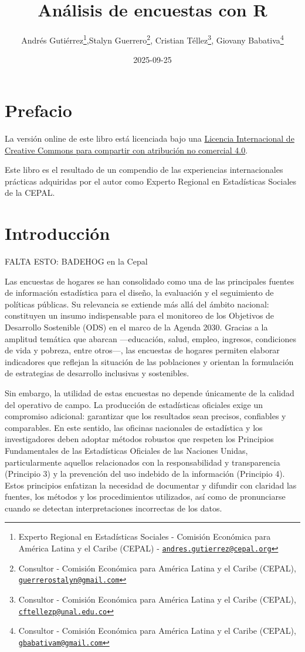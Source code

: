 \documentclass[
  spanish,
  12pt,
]{book}
\title{Análisis de encuestas con R}
\author{Andrés Gutiérrez\footnote{Experto Regional en Estadísticas Sociales - Comisión Económica para América Latina y el Caribe (CEPAL) - \href{mailto:andres.gutierrez@cepal.org}{\nolinkurl{andres.gutierrez@cepal.org}}},Stalyn Guerrero\footnote{Consultor - Comisión Económica para América Latina y el Caribe (CEPAL), \href{mailto:guerrerostalyn@gmail.com}{\nolinkurl{guerrerostalyn@gmail.com}}}, Cristian Téllez\footnote{Consultor - Comisión Económica para América Latina y el Caribe (CEPAL), \href{mailto:cftellezp@unal.edu.co}{\nolinkurl{cftellezp@unal.edu.co}}}, Giovany Babativa\footnote{Consultor - Comisión Económica para América Latina y el Caribe (CEPAL), \href{mailto:gbabativam@gmail.com}{\nolinkurl{gbabativam@gmail.com}}}}
\date{2025-09-25}
\begin{document}
\maketitle

{
\hypersetup{linkcolor=}
\setcounter{tocdepth}{1}
\tableofcontents
}
\listoffigures
\listoftables
\chapter*{Prefacio}\label{prefacio}

La versión online de este libro está licenciada bajo una \href{http://creativecommons.org/licenses/by-nc-sa/4.0/}{Licencia Internacional de Creative Commons para compartir con atribución no comercial 4.0}.

Este libro es el resultado de un compendio de las experiencias internacionales prácticas adquiridas por el autor como Experto Regional en Estadísticas Sociales de la CEPAL.

\chapter{Introducción}\label{introducciuxf3n}

FALTA ESTO: BADEHOG en la Cepal

Las encuestas de hogares se han consolidado como una de las principales fuentes de información estadística para el diseño, la evaluación y el seguimiento de políticas públicas. Su relevancia se extiende más allá del ámbito nacional: constituyen un insumo indispensable para el monitoreo de los Objetivos de Desarrollo Sostenible (ODS) en el marco de la Agenda 2030. Gracias a la amplitud temática que abarcan ---educación, salud, empleo, ingresos, condiciones de vida y pobreza, entre otros---, las encuestas de hogares permiten elaborar indicadores que reflejan la situación de las poblaciones y orientan la formulación de estrategias de desarrollo inclusivas y sostenibles.

Sin embargo, la utilidad de estas encuestas no depende únicamente de la calidad del operativo de campo. La producción de estadísticas oficiales exige un compromiso adicional: garantizar que los resultados sean precisos, confiables y comparables. En este sentido, las oficinas nacionales de estadística y los investigadores deben adoptar métodos robustos que respeten los Principios Fundamentales de las Estadísticas Oficiales de las Naciones Unidas, particularmente aquellos relacionados con la responsabilidad y transparencia (Principio 3) y la prevención del uso indebido de la información (Principio 4). Estos principios enfatizan la necesidad de documentar y difundir con claridad las fuentes, los métodos y los procedimientos utilizados, así como de pronunciarse cuando se detectan interpretaciones incorrectas de los datos.
\end{document}
